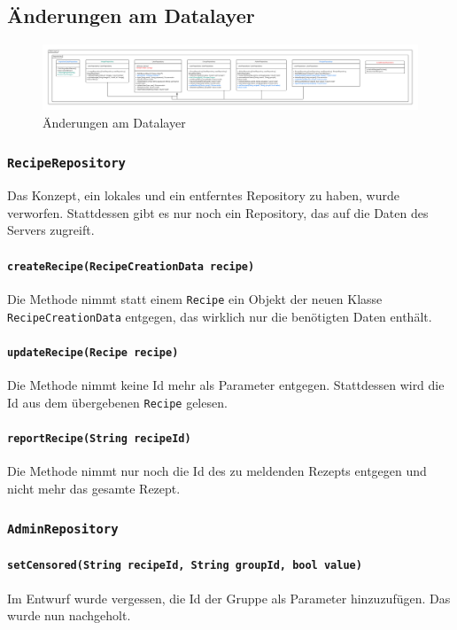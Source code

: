 \documentclass{implementierungsheft}
\begin{document}
\subsection{Änderungen am Datalayer}
\begin{figure}[htp]
    \centering
    \includegraphics[width=\textwidth]{images/uml/dataLayer.pdf}
    \caption{Änderungen am Datalayer}
    \label{fig:dataLayer}
\end{figure}
\subsubsection{\texttt{RecipeRepository}}
Das Konzept, ein lokales und ein entferntes Repository zu haben, wurde verworfen. Stattdessen gibt es nur noch ein Repository, das auf die Daten des Servers zugreift.
\paragraph{\texttt{createRecipe(RecipeCreationData recipe)}} Die Methode nimmt statt einem \texttt{Recipe} ein Objekt der neuen Klasse \texttt{RecipeCreationData} entgegen, das wirklich nur die benötigten Daten enthält.
\paragraph{\texttt{updateRecipe(Recipe recipe)}} Die Methode nimmt keine Id mehr als Parameter entgegen. Stattdessen wird die Id aus dem übergebenen \texttt{Recipe} gelesen.
\paragraph{\texttt{reportRecipe(String recipeId)}} Die Methode nimmt nur noch die Id des zu meldenden Rezepts entgegen und nicht mehr das gesamte Rezept.
\subsubsection{\texttt{AdminRepository}}
\paragraph{\texttt{setCensored(String recipeId, String groupId, bool value)}} Im Entwurf wurde vergessen, die Id der Gruppe als Parameter hinzuzufügen. Das wurde nun nachgeholt.
\end{document}
